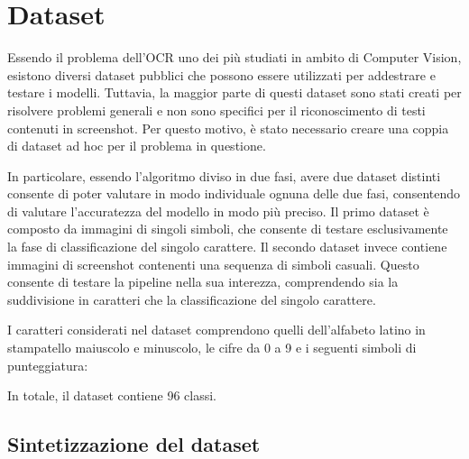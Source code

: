 \chapter{Dataset}

Essendo il problema dell'OCR uno dei più studiati in ambito di Computer Vision, esistono diversi dataset pubblici che possono essere utilizzati per addestrare e testare i modelli. Tuttavia, la maggior parte di questi dataset sono stati creati per risolvere problemi generali e non sono specifici per il riconoscimento di testi contenuti in screenshot. Per questo motivo, è stato necessario creare una coppia di dataset ad hoc per il problema in questione.

In particolare, essendo l'algoritmo diviso in due fasi, avere due dataset distinti consente di poter valutare in modo individuale ognuna delle due fasi, consentendo di valutare l'accuratezza del modello in modo più preciso.
Il primo dataset è composto da immagini di singoli simboli, che consente di testare esclusivamente la fase di classificazione del singolo carattere.
Il secondo dataset invece contiene immagini di screenshot contenenti una sequenza di simboli casuali. Questo consente di testare la pipeline nella sua interezza, comprendendo sia la suddivisione in caratteri che la classificazione del singolo carattere.

I caratteri considerati nel dataset comprendono quelli dell'alfabeto latino in stampatello maiuscolo e minuscolo, le cifre da 0 a 9 e i seguenti simboli di punteggiatura:

\centering


\raggedright

In totale, il dataset contiene 96 classi.

\section{Sintetizzazione del dataset}


